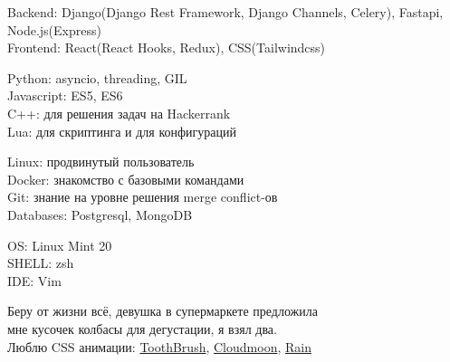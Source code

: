 \documentclass[10pt]{article} %
\begin{document}
{
  Backend: Django(Django Rest Framework, Django Channels, Celery), Fastapi, Node.js(Express)\\
  Frontend: React(React Hooks, Redux), CSS(Tailwindcss)
}

{
  Python: asyncio, threading, GIL\\
  Javascript: ES5, ES6\\
  C++: для решения задач на Hackerrank\\
  Lua: для скриптинга и для конфигураций
}

{
  Linux: продвинутый пользователь\\
  Docker: знакомство с базовыми командами\\
  Git: знание на уровне решения merge conflict-ов\\
  Databases: Postgresql, MongoDB
}


{
  OS: Linux Mint 20\\
  SHELL: zsh\\
  IDE: Vim
}

{
  Беру от жизни всё, девушка в супермаркете предложила \\ 
  мне кусочек колбасы для дегустации, я взял два. \\ 
  Люблю CSS анимации: \href{https://kuator.github.io/gh-pages/image-reveal-kinda}{ToothBrush},
    \href{https://kuator.github.io/gh-pages/cloudmoon}{Cloudmoon},
    \href{https://kuator.github.io/gh-pages/rain/}{Rain}
}
\end{document}
